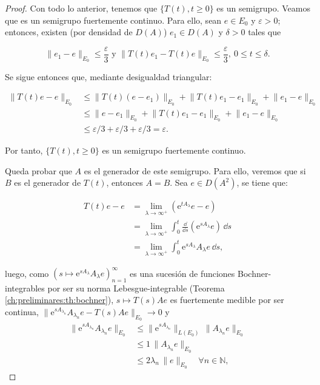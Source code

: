 \begin{proof}
    Con todo lo anterior, tenemos que $\{T(t), t \geq 0\}$ es un semigrupo. Veamos que es un semigrupo fuertemente continuo. Para ello, sean $e \in E_0$ y $\varepsilon > 0$; entonces, existen (por densidad de $D(A)$) $e_1 \in D(A)$ y $\delta > 0$ tales que

    \[\lVert e_1 -e\rVert_{E_0} \leq \frac{\varepsilon}{3} \text{ y } \lVert T(t)e_1 -T(t)e\rVert_{E_0} \leq \frac{\varepsilon}{3}, \ 0 \leq t \leq \delta.\]

    Se sigue entonces que, mediante desigualdad triangular:

    \begin{align*}
        \lVert T(t)e - e\rVert_{E_0} &\leq \lVert T(t)(e-e_1)\rVert_{E_0} + \lVert T(t)e_1 - e_1\rVert_{E_0} + \lVert e_1 - e \rVert_{E_0}\\
        &\leq \lVert e - e_1 \rVert_{E_0} +  \lVert T(t)e_1 - e_1\rVert_{E_0} + \lVert e_1 - e \rVert_{E_0}\\
        &\leq \varepsilon/3 + \varepsilon/3 + \varepsilon/3 = \varepsilon.
    \end{align*}

    Por tanto, $\{T(t), t \geq 0\}$ es un semigrupo fuertemente continuo.

    Queda probar que $A$ es el generador de este semigrupo. Para ello, veremos que si $B$ es el generador de $T(t)$, entonces $A = B$. Sea $e \in D(A^2)$, se tiene que:

    \begin{align*}
        T(t)e - e &= \lim_{\lambda \rightarrow \infty^+}(\mathrm{e}^{tA_\lambda}e - e)\\
        &= \lim_{\lambda \rightarrow \infty^+} \int_0^t \frac{\dd}{\dd s} (\mathrm{e}^{sA_\lambda}e) \, \dd s\\
        &= \lim_{\lambda \rightarrow \infty^+} \int_0^t \mathrm{e}^{sA_\lambda}A_\lambda e \, \dd s,
    \end{align*}

    luego, como $(s \mapsto \mathrm{e}^{sA_\lambda}A_\lambda e)_{n=1}^\infty$ es una sucesión de funciones Bochner-integrables por ser su norma Lebesgue-integrable (Teorema \ref{ch:preliminares:th:bochner}), $s \mapsto T(s)Ae$ es fuertemente medible por ser continua, $\lVert \mathrm{e}^{sA_{\lambda_n}}A_{\lambda_n}e - T(s)Ae \rVert_{E_0} \rightarrow 0$\footnotemark \text{} y
    \begin{align*}
        \lVert \mathrm{e}^{sA_{\lambda_n}}A_{\lambda_n}e\rVert_{E_0} &\leq  \lVert \mathrm{e}^{sA_{\lambda_n}}\rVert_{L(E_0)} \, \lVert A_{\lambda_n}e\rVert_{E_0}\\
        &\leq 1 \, \lVert A_{\lambda_n}e\rVert_{E_0}\\
        &\leq 2\lambda_n \, \lVert e \rVert_{E_0} \quad \forall n \in \mathbb{N},
    \end{align*}


\end{proof}
